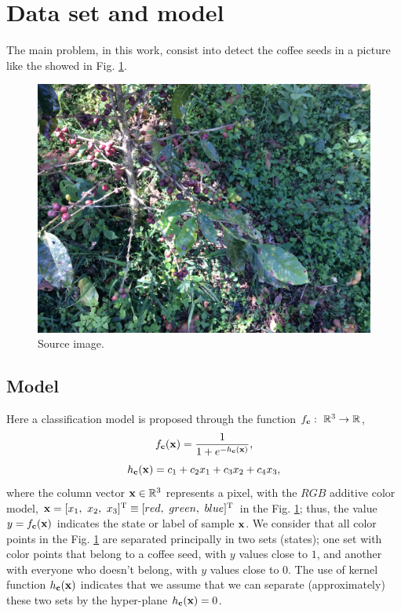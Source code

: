 \section{Data set and model}
The main problem, in this work, consist into 
detect the coffee seeds  in a picture like the showed in Fig. \ref{fig:data-color}.
\begin{figure}[h!]
\centering
\includegraphics[width=0.99\linewidth]{IMG_0225.JPG}
\caption{Source image.}
\label{fig:data-color}
\end{figure} 

\subsection{Model}
Here a classification model is proposed through the function
$f_{\VECTOR{c}}:~\mathbb{R}^{3} \rightarrow \mathbb{R}$,
\begin{equation}
f_{\VECTOR{c}}(\VECTOR{x})=\frac{1}{1+e^{-h_{\VECTOR{c}}(\VECTOR{x})}},
\end{equation}
\begin{equation}
h_{\VECTOR{c}}(\VECTOR{x}) = c_1+c_2 x_1+c_3 x_2+c_4 x_3,
\end{equation}
where the column vector $\VECTOR{x}\in \mathbb{R}^{3}$ represents a pixel,
 with the $RGB$ additive color model,
 $\VECTOR{x}=[x_1,~ x_2,~ x_3]^{\transpose}\equiv [red,~ green,~ blue]^{\transpose}$
in the Fig. \ref{fig:data-color};
thus, the value $y=f_{\VECTOR{c}}(\VECTOR{x})$ indicates the state or label 
of sample $\VECTOR{x}$.
We consider that all color points  in the Fig. \ref{fig:data-color}
are separated principally in two sets (states); 
one set with color points that belong to a coffee seed,
with $y$ values close to $1$,
and another with everyone who doesn't belong, with $y$ values close to $0$.
The use of kernel function $h_{\VECTOR{c}}(\VECTOR{x})$ 
indicates that we assume that we can separate (approximately) 
these two sets by the hyper-plane $h_{\VECTOR{c}}(\VECTOR{x})=0$.

